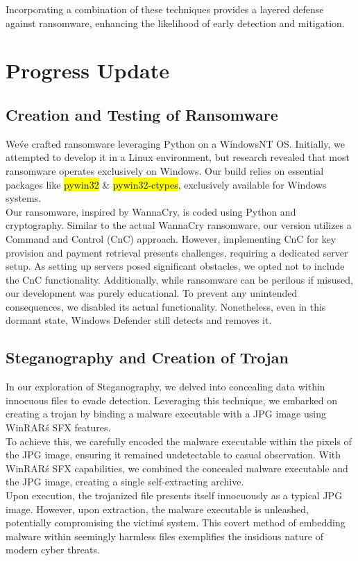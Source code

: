 \documentclass[12pt,twocolumn]{article}
\begin{document}
Incorporating a combination of these techniques provides a layered defense against ransomware, enhancing the likelihood of early detection and mitigation.

%
\section{Progress Update}

\subsection{Creation and Testing of Ransomware}

We\'ve crafted ransomware leveraging Python on a WindowsNT OS. Initially, we attempted to develop it in a Linux environment, but research revealed that most ransomware operates exclusively on Windows. Our build relies on essential packages like \hl{pywin32} \& \hl{pywin32-ctypes}, exclusively available for Windows systems.
\\
Our ransomware, inspired by WannaCry, is coded using Python and cryptography. Similar to the actual WannaCry ransomware, our version utilizes a Command and Control (CnC) approach. However, implementing CnC for key provision and payment retrieval presents challenges, requiring a dedicated server setup. As setting up servers posed significant obstacles, we opted not to include the CnC functionality. Additionally, while ransomware can be perilous if misused, our development was purely educational. To prevent any unintended consequences, we disabled its actual functionality. Nonetheless, even in this dormant state, Windows Defender still detects and removes it.

\subsection{Steganography and Creation of Trojan}
In our exploration of Steganography, we delved into concealing data within innocuous files to evade detection. Leveraging this technique, we embarked on creating a trojan by binding a malware executable with a JPG image using WinRAR\'s SFX features.
\\
To achieve this, we carefully encoded the malware executable within the pixels of the JPG image, ensuring it remained undetectable to casual observation. With WinRAR\'s SFX capabilities, we combined the concealed malware executable and the JPG image, creating a single self-extracting archive.
\\
Upon execution, the trojanized file presents itself innocuously as a typical JPG image. However, upon extraction, the malware executable is unleashed, potentially compromising the victim\'s system. This covert method of embedding malware within seemingly harmless files exemplifies the insidious nature of modern cyber threats.
\end{document}
